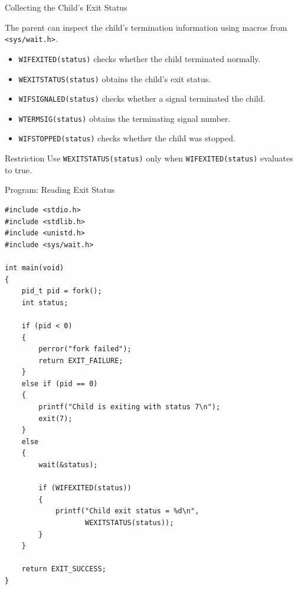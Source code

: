 \documentclass[aspectratio=169]{beamer}
\begin{document}
\begin{frame}{Collecting the Child's Exit Status}

The parent can inspect the child's termination information using macros from
\texttt{<sys/wait.h>}.

\begin{itemize}
    \item \texttt{WIFEXITED(status)} checks whether the child terminated normally.
    \item \texttt{WEXITSTATUS(status)} obtains the child's exit status.
    \item \texttt{WIFSIGNALED(status)} checks whether a signal terminated the
    child.
    \item \texttt{WTERMSIG(status)} obtains the terminating signal number.
    \item \texttt{WIFSTOPPED(status)} checks whether the child was stopped.
\end{itemize}

\begin{alertblock}{Restriction}
Use \texttt{WEXITSTATUS(status)} only when
\texttt{WIFEXITED(status)} evaluates to true.
\end{alertblock}

\end{frame}

\begin{frame}[fragile]{Program: Reading Exit Status}

\begin{lstlisting}[style=cstyle]
#include <stdio.h>
#include <stdlib.h>
#include <unistd.h>
#include <sys/wait.h>

int main(void)
{
    pid_t pid = fork();
    int status;

    if (pid < 0)
    {
        perror("fork failed");
        return EXIT_FAILURE;
    }
    else if (pid == 0)
    {
        printf("Child is exiting with status 7\n");
        exit(7);
    }
    else
    {
        wait(&status);

        if (WIFEXITED(status))
        {
            printf("Child exit status = %d\n",
                   WEXITSTATUS(status));
        }
    }

    return EXIT_SUCCESS;
}
\end{lstlisting}

\end{frame}
\end{document}
